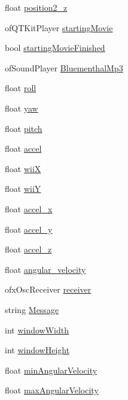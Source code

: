 \begin{DoxyCompactItemize}
\item 
float \hyperlink{classtest_app_a0720011cfaade6388109232ea4927c19}{position2\-\_\-z}
\item 
of\-Q\-T\-Kit\-Player \hyperlink{classtest_app_a9bfe7793fa0689a991ff64174745c38f}{starting\-Movie}
\item 
bool \hyperlink{classtest_app_aea3cb9f5f0061a42a4953d6b6c949036}{starting\-Movie\-Finished}
\item 
of\-Sound\-Player \hyperlink{classtest_app_af696fd13ee9ecb38ac0ba0b72543ce06}{Bluementhal\-Mp3}
\item 
float \hyperlink{classtest_app_a020730abb55e6ae6d0a28edee19050e0}{roll}
\item 
float \hyperlink{classtest_app_a865985f78dd5def3ed20c87b9fc772b6}{yaw}
\item 
float \hyperlink{classtest_app_aabbebeb113838374f659e86a0355b260}{pitch}
\item 
float \hyperlink{classtest_app_a8e560e923c82d421857538e4a5927542}{accel}
\item 
float \hyperlink{classtest_app_a7a77e8633c3a94e3e409a33a5cd9ae3f}{wii\-X}
\item 
float \hyperlink{classtest_app_a5ae41896388ae16ee530beca5333e02a}{wii\-Y}
\item 
float \hyperlink{classtest_app_ad1738ff98d225f80b853a9ddc9f5a116}{accel\-\_\-x}
\item 
float \hyperlink{classtest_app_a204bcb2412a70a65ebea6008ee8c4eb0}{accel\-\_\-y}
\item 
float \hyperlink{classtest_app_a61dbdd5c0b868568dde40a52f6e56054}{accel\-\_\-z}
\item 
float \hyperlink{classtest_app_a98e05c3206ff95fccfebfc9df5317598}{angular\-\_\-velocity}
\item 
ofx\-Osc\-Receiver \hyperlink{classtest_app_a034c44ff60fa1e5f021e90d5410ba657}{receiver}
\item 
string \hyperlink{classtest_app_a0124035d0454fb6bd9152f8a87c40677}{Message}
\item 
int \hyperlink{classtest_app_a9ed611377cd46f5148a3a3d538e96484}{window\-Width}
\item 
int \hyperlink{classtest_app_a4e8884eeef5b2657b62278969d4e3dcf}{window\-Height}
\item 
float \hyperlink{classtest_app_ac559756a01e0b98378bc29dfba9fac79}{min\-Angular\-Velocity}
\item 
float \hyperlink{classtest_app_ab9565e8e6dc748ef68e6845f5f94cae9}{max\-Angular\-Velocity}
\item 

\end{DoxyCompactItemize}
